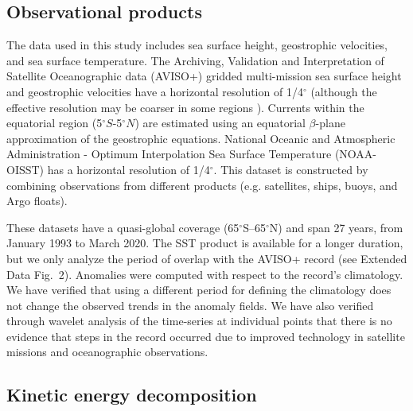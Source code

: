 \documentclass{nature}
\begin{document}
\subsection{Observational products}\mbox{}\vspace{-1.5em}

The data used in this study includes sea surface height, geostrophic velocities, and sea surface temperature. The Archiving, Validation and Interpretation of Satellite Oceanographic data (AVISO+) gridded multi-mission sea surface height and geostrophic velocities have a horizontal resolution of 1/4$^\circ$ (although the effective resolution may be coarser in some regions \cite{Chelton_The_2011}). Currents within the equatorial region (5$^\circ S$-5$^\circ N$) are estimated using an equatorial $\beta$-plane approximation of
the geostrophic equations\cite{Lagerloef_velocities_1999}. National Oceanic and Atmospheric Administration - Optimum Interpolation Sea Surface Temperature (NOAA-OISST) has a horizontal resolution of 1/4$^\circ$\cite{Banzon_OISST_2020}. This dataset is constructed by combining observations from different products (e.g. satellites, ships, buoys, and Argo floats).

These datasets have a quasi-global coverage (65$^\circ$S--65$^\circ$N) and span 27 years, from January 1993 to March 2020. The SST product is available for a longer duration, but we only analyze the period of overlap with the AVISO+ record (see Extended Data Fig.~2). Anomalies were computed with respect to the record's climatology. We have verified that using a different period for defining the climatology does not change the observed trends in the anomaly fields. We have also verified through wavelet analysis of the time-series at individual points that there is no evidence that steps in the record occurred due to improved technology in satellite missions and oceanographic observations.

\subsection{Kinetic energy decomposition}\mbox{}\vspace{-1.5em}
\end{document}
